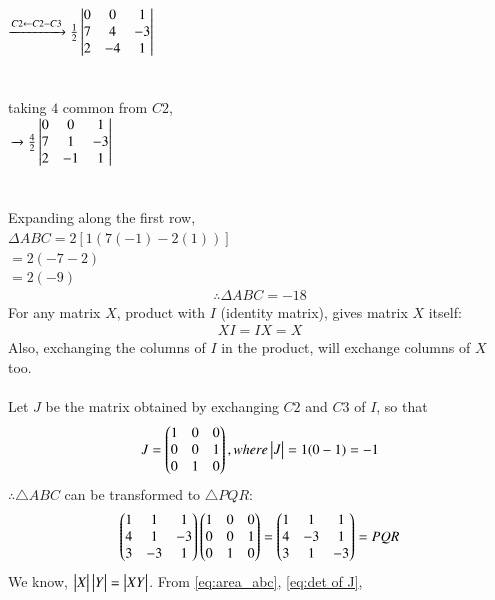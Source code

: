 \documentclass[journal,12pt,twocolumn]{IEEEtran}
\renewcommand\thesection{\arabic{section}}
\begin{document}
\begin{enumerate}[label=\thesection.\arabic*.,ref=\thesection.\theenumi]
\\\\\\
$\xrightarrow[]{C2\leftarrow C2-C3}\frac{1}{2}\begin{vmatrix}0 & 0 & 1\\ 7 & 4 & -3\\ 2 & -4 & 1\end{vmatrix}$
\\\\\\
taking $4$ common from $C2$,\\
$\\\xrightarrow[]{}\frac{4}{2}\begin{vmatrix}0 & 0 & 1\\7 & 1 & -3\\2 & -1 & 1\end{vmatrix}$
\\\\\\
Expanding along the first row,
\\$\Delta ABC=2\left [ 1(7(-1)-2(1)) \right ]$
\\$=2\left ( -7-2 \right )$
\\$=2\left ( -9 \right )$
\begin{align}
\label{eq:area_abc}
\therefore \Delta ABC=-18
\end{align}
For any matrix $X$, product with $I$ (identity matrix), gives matrix $X$ itself:
\begin{align}
    XI=IX=X
\end{align}
Also, exchanging the columns of $I$ in the product, will exchange columns of $X$ too.\\\\
Let $J$ be the matrix obtained by exchanging $C2$ and $C3$ of $I$, so that
\begin{align}
\label{eq:det of J}
J=\begin{pmatrix}1 & 0 & 0\\0 & 0 & 1\\ 0 & 1 & 0\end{pmatrix} , where \begin{vmatrix}J\end{vmatrix} =1(0-1)=-1
\end{align}
$\therefore\triangle ABC$ can be transformed to $\triangle PQR$:
\begin{align}
\begin{pmatrix}1 & 1 & 1 \\ 4 & 1 & -3\\ 3 & -3 & 1\end{pmatrix}
\begin{pmatrix}1 & 0 & 0\\ 0 & 0 & 1\\0 & 1 & 0\end{pmatrix}=
\begin{pmatrix}1 & 1 & 1\\4 & -3 & 1\\ 3 & 1 & -3\end{pmatrix}=PQR
\end{align}
We know, $\begin{vmatrix}X\end{vmatrix}\begin{vmatrix}Y\end{vmatrix}=\begin{vmatrix}XY\end{vmatrix}$. From \eqref{eq:area_abc}, \eqref{eq:det of J}, \\

\end{enumerate}
\end{document}
